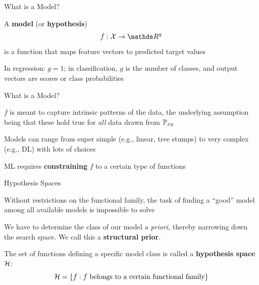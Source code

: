 \documentclass[11pt,compress,t,notes=noshow, xcolor=table]{beamer}
\begin{document}


\begin{framei}{What is a Model?}
\item A \textbf{model} (or \textbf{hypothesis}) 
$$
f : \Xspace \rightarrow \R^g
$$ 
is a function that maps feature vectors to predicted target values
\item In regression: $g = 1$; in classification, $g$ is the number of classes, and output vectors are scores or class probabilities
\end{framei}


\begin{framei}{What is a Model?}
\item $f$ is meant to capture intrinsic patterns of the data, the underlying assumption being that these hold true for \emph{all} data drawn from $\mathbb{P}_{xy}$
\item Models can range from super simple (e.g., linear, tree stumps) to very complex (e.g., DL) with lots of choices
\vfill
{}
\item ML requires \textbf{constraining} $f$ to a certain type of functions
\end{framei}


\begin{framei}[sep=L]{Hypothesis Spaces}
\item Without restrictions on the functional family, the task of finding a \enquote{good} model among all available models is impossible to solve
\item We have to determine the class of our model \emph{a priori}, thereby narrowing down the search space. We call this a \textbf{structural prior}.
\item The set of functions defining a specific model class is called a 
\textbf{hypothesis space} $\mathcal{H}$:
$$\mathcal{H} = \{f: f \text{ belongs to a certain functional family}\}$$
\end{framei}
\end{document}
